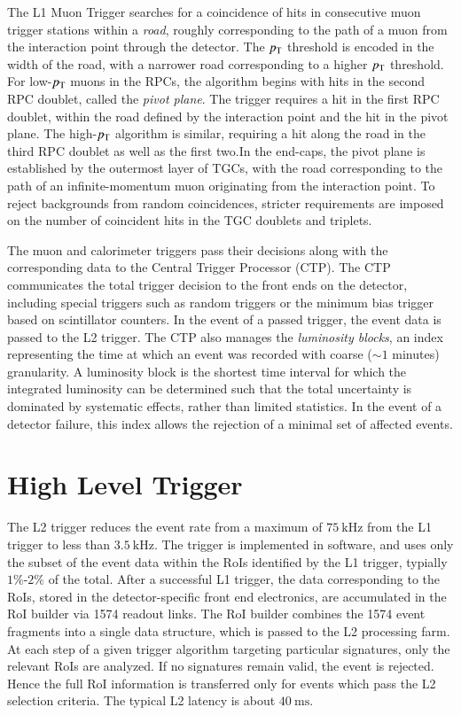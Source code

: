 The L1 Muon Trigger searches for a coincidence of hits in consecutive muon trigger stations within a \emph{road}, roughly corresponding to the path of a muon from the interaction point through the detector. The $p_{\text{T}}$ threshold is encoded in the width of the road, with a narrower road corresponding to a higher $p_{\text{T}}$ threshold. For low-$p_{\text{T}}$ muons in the RPCs, the algorithm begins with hits in the second RPC doublet, called the \emph{pivot plane}. The trigger requires a hit in the first RPC doublet, within the road defined by the interaction point and the hit in the pivot plane. The high-$p_{\text{T}}$ algorithm is similar, requiring a hit along the road in the third RPC doublet as well as the first two.In the end-caps, the pivot plane is established by the outermost layer of TGCs, with the road corresponding to the path of an infinite-momentum muon originating from the interaction point. To reject backgrounds from random coincidences, stricter requirements are imposed on the number of coincident hits in the TGC doublets and triplets.

The muon and calorimeter triggers pass their decisions along with the corresponding data to the Central Trigger Processor (CTP). The CTP communicates the total trigger decision to the front ends on the detector, including special triggers such as random triggers or the minimum bias trigger based on scintillator counters. In the event of a passed trigger, the event data is passed to the L2 trigger. The CTP also manages the \emph{luminosity blocks}, an index representing the time at which an event was recorded with coarse ($\sim1$ minutes) granularity. A luminosity block is the shortest time interval for which the integrated luminosity can be determined such that the total uncertainty is dominated by systematic effects, rather than limited statistics. In the event of a detector failure, this index allows the rejection of a minimal set of affected events. 

\section{High Level Trigger}\label{sec:experiment-trigger-HLT}

The L2 trigger reduces the event rate from a maximum of $75~\mbox{kHz}$ from the L1 trigger to less than $\SI{3.5}{\kilo\hertz}$. The trigger is implemented in software, and uses only the subset of the event data within the RoIs identified by the L1 trigger, typially $1\%$-$2\%$ of the total. After a successful L1 trigger, the data corresponding to the RoIs, stored in the detector-specific front end electronics, are accumulated in the RoI builder via 1574 readout links. The RoI builder combines the 1574 event fragments into a single data structure, which is passed to the L2 processing farm. At each step of a given trigger algorithm targeting particular signatures, only the relevant RoIs are analyzed. If no signatures remain valid, the event is rejected. Hence the full RoI information is transferred only for events which pass the L2 selection criteria. The typical L2 latency is about $\SI{40}{\milli\second}$.

